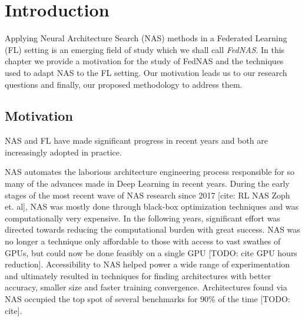 \chapter{Introduction}\label{chapter:introduction}






Applying Neural Architecture Search (NAS) methods in a Federated Learning (FL) setting is an emerging field of study which we shall call \textit{FedNAS}. In this chapter we provide a motivation for the study of FedNAS and the techniques used to adapt NAS to the FL setting. Our motivation leads us to our research questions and finally, our proposed methodology to address them.


\section{Motivation}

NAS and FL have made significant progress in recent years and both are increasingly adopted in practice. 

NAS automates the laborious architecture engineering process responsible for so many of the advances made in Deep Learning in recent years. During the early stages of the most recent wave of NAS research since 2017 [cite: RL NAS Zoph et. al], NAS was mostly done through black-box optimization techniques and was computationally very expensive. In the following years, significant effort was directed towards reducing the computational burden with great success. NAS was no longer a technique only affordable to those with access to vast swathes of GPUs, but could now be done feasibly on a single GPU [TODO: cite GPU hours reduction]. Accessibility to NAS helped power a wide range of experimentation and ultimately resulted in techniques for finding architectures with better accuracy, smaller size and faster training convergence. Architectures found via NAS occupied the top spot of several benchmarks for 90\% of the time [TODO: cite].

